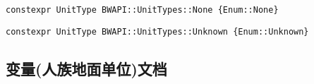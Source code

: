 \begin{tcolorbox}[colback=white, colframe=black!60!white, title=None(), arc=0mm]
\begin{verbatim}
constexpr UnitType BWAPI::UnitTypes::None {Enum::None}
\end{verbatim}
\end{tcolorbox}

\begin{tcolorbox}[colback=white, colframe=black!60!white, title=Unknown(), arc=0mm]
\begin{verbatim}
constexpr UnitType BWAPI::UnitTypes::Unknown {Enum::Unknown}
\end{verbatim}
\end{tcolorbox}

\subsection{变量(人族地面单位)文档}

